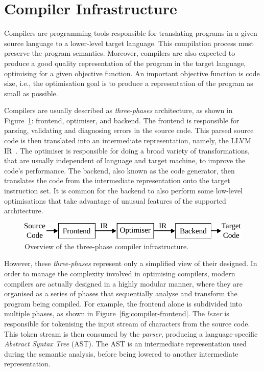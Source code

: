 
\section{Compiler Infrastructure}

Compilers are programming tools responsible for translating programs in a given source language to a lower-level target language.
This compilation process must preserve the program semantics.
Moreover, compilers are also expected to produce a good quality representation of the program in the target language, optimising for a given objective function.
An important objective function is code size, i.e., the optimisation goal is to produce a representation of the program as small as possible.

Compilers are usually described as \textit{three-phases} architecture, as shown in Figure~\ref{fig:3-phase-compiler}: frontend, optimiser, and backend.
The frontend is responsible for parsing, validating and diagnosing errors in the source code.
This parsed source code is then translated into an intermediate representation, namely, the LLVM IR~\cite{llvm}.
The optimiser is responsible for doing a broad variety of transformations, that are usually independent of language and target machine, to improve the code's performance.
The backend, also known as the code generator, then translates the code from the intermediate representation onto the target instruction set.
It is common for the backend to also perform some low-level optimisations that take advantage of unusual features of the supported architecture.

\begin{figure}[h]
  \centering
  \includegraphics[scale=0.9]{src/background/figs/3-phase-compiler.pdf}
  \caption{Overview of the three-phase compiler infrastructure.}
  \label{fig:3-phase-compiler}
\end{figure}

However, these \textit{three-phases} represent only a simplified view of their designed.
In order to manage the complexity involved in optimising compilers, modern compilers are actually designed in a highly modular manner, where they are organised as a series of phases that sequentially analyse and transform the program being compiled.
For example, the frontend alone is subdivided into multiple phases, as shown in Figure~\ref{fig:compiler-frontend}.
The \textit{lexer} is responsible for tokenising the input stream of characters from the source code.
This token stream is then consumed by the \textit{parser}, producing a language-specific \textit{Abstract Syntax Tree} (AST).
The AST is an intermediate representation used during the semantic analysis, before being lowered to another intermediate representation.

